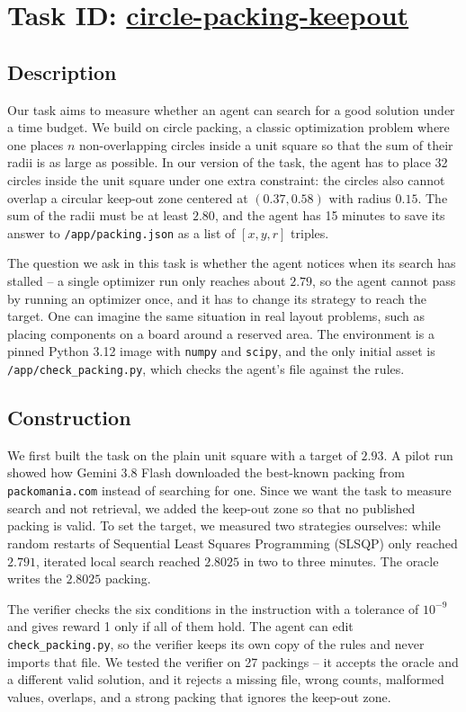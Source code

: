 \documentclass[11pt]{article}
\begin{document}
\section*{Task ID: \underline{circle-packing-keepout}}
\subsection*{Description}
Our task aims to measure whether an agent can search for a good solution under a time
budget. We build on circle packing, a classic optimization problem where one places $n$
non-overlapping circles inside a unit square so that the sum of their radii is as large
as possible. In our version of the task, the agent has to place 32 circles inside the
unit square under one extra constraint: the circles also cannot overlap a circular
keep-out zone centered at $(0.37, 0.58)$ with radius $0.15$. The sum of the radii must
be at least $2.80$, and the agent has 15 minutes to save its answer to
\texttt{/app/packing.json} as a list of $[x, y, r]$ triples.

The question we ask in this task is whether the agent notices when its search has
stalled -- a single optimizer run only reaches about $2.79$, so the agent cannot pass by
running an optimizer once, and it has to change its strategy to reach the target. One
can imagine the same situation in real layout problems, such as placing components on a
board around a reserved area. The environment is a pinned Python 3.12 image with
\texttt{numpy} and \texttt{scipy}, and the only initial asset is
\texttt{/app/check\_packing.py}, which checks the agent's file against the rules.
\subsection*{Construction}
We first built the task on the plain unit square with a target of $2.93$. A pilot run
showed how Gemini 3.8 Flash downloaded the best-known packing from
\texttt{packomania.com} instead of searching for one. Since we want the task to measure
search and not retrieval, we added the keep-out zone so that no published packing is
valid. To set the target, we measured two strategies ourselves: while random restarts
of Sequential Least Squares Programming (SLSQP) only reached $2.791$, iterated local search reached $2.8025$ in two to three
minutes. The oracle writes the $2.8025$ packing.

The verifier checks the six conditions in the instruction with a tolerance of $10^{-9}$
and gives reward 1 only if all of them hold. The agent can edit
\texttt{check\_packing.py}, so the verifier keeps its own copy of the rules and never
imports that file. We tested the verifier on 27 packings -- it accepts the oracle and a
different valid solution, and it rejects a missing file, wrong counts, malformed values,
overlaps, and a strong packing that ignores the keep-out zone.
\end{document}
